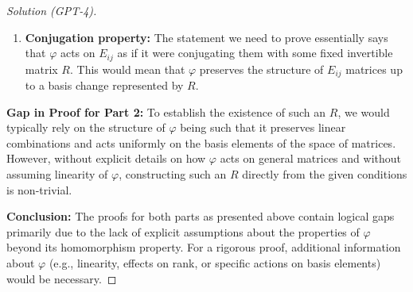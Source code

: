 \documentclass[11pt]{article}
\numberwithin{equation}{section}
\begin{document}
\begin{proof}[Solution (GPT-4)]
\begin{enumerate}
  \item \textbf{Conjugation property:} The statement we need to prove essentially says that $\varphi$ acts on $E_{ij}$ as if it were conjugating them with some fixed invertible matrix $R$. This would mean that $\varphi$ preserves the structure of $E_{ij}$ matrices up to a basis change represented by $R$.
\end{enumerate}

\textbf{Gap in Proof for Part 2:} To establish the existence of such an $R$, we would typically rely on the structure of $\varphi$ being such that it preserves linear combinations and acts uniformly on the basis elements of the space of matrices. However, without explicit details on how $\varphi$ acts on general matrices and without assuming linearity of $\varphi$, constructing such an $R$ directly from the given conditions is non-trivial.

\textbf{Conclusion:} The proofs for both parts as presented above contain logical gaps primarily due to the lack of explicit assumptions about the properties of $\varphi$ beyond its homomorphism property. For a rigorous proof, additional information about $\varphi$ (e.g., linearity, effects on rank, or specific actions on basis elements) would be necessary.

\end{proof}
\end{document}
